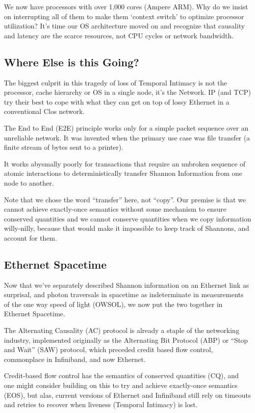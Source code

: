\documentclass[../../../OAE-SPEC-MAIN.tex]{subfiles}
\begin{document}
We now have processors with over 1,000 cores (Ampere ARM). Why do we insist on interrupting all of them to make them ‘context switch’ to optimize processor utilization? It’s time our OS architecture moved on and recognize that causality and latency are the scarce resources, not CPU cycles or network bandwidth.

\subsection{Where Else is this Going?}

The biggest culprit in this tragedy of loss of Temporal Intimacy is not the processor, cache hierarchy or OS in a single node, it's the Network.
IP (and TCP) try their best to cope with what they can get on top of lossy Ethernet in a conventional Clos network.

The End to End (E2E) principle works only for a simple packet sequence over an unreliable network. It was invented when the primary use case was file transfer (a finite stream of bytes sent to a printer).

It works abysmally poorly for transactions that require an unbroken sequence of atomic interactions to deterministically transfer Shannon Information from one node to another.

Note that we chose the word “transfer” here, not “copy”. Our premise is that we cannot achieve exactly-once semantics without some mechanism to ensure conserved quantities and we cannot conserve quantities when we copy information willy-nilly, because that would make it impossible to keep track of Shannons, and account for them.

\subsection{Ethernet Spacetime}
Now that we’ve separately described Shannon information on an Ethernet link as surprisal, and photon traversals in spacetime as indeterminate in measurements of the one way speed of light (OWSOL), we now put the two together in Ethernet Spacetime.

The Alternating Causality (AC) protocol is already a staple of the networking industry, implemented originally as the Alternating Bit Protocol (ABP) or “Stop and Wait” (SAW) protocol, which preceded credit based flow control, commonplace in Infiniband, and now Ethernet.

Credit-based flow control has the semantics of conserved quantities (CQ), and one might consider building on this to try and achieve exactly-once semantics (EOS), but alas, current versions of Ethernet and Infiniband still rely on timeouts and retries to recover when liveness (Temporal Intimacy) is lost.
\end{document}
